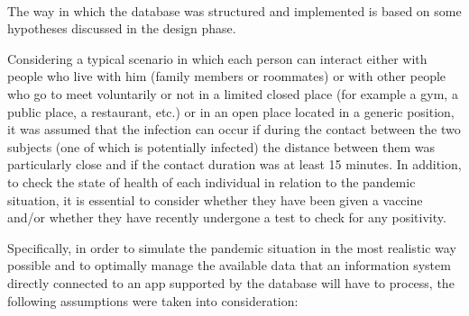 \documentclass[a4paper,12pt]{article}
\begin{document}
\paragraph{} The way in which the database was structured and implemented is based on some hypotheses discussed in the design phase. \par Considering a typical scenario in which each person can interact either with people who live with him (family members or roommates) or with other people who go to meet voluntarily or not in a limited closed place (for example a gym, a public place, a restaurant, etc.) or in an open place located in a generic position, it was assumed that the infection can occur if during the contact between the two subjects (one of which is potentially infected) the distance between them was particularly close and if the contact duration was at least 15 minutes. In addition, to check the state of health of each individual in relation to the pandemic situation, it is essential to consider whether they have been given a vaccine and/or whether they have recently undergone a test to check for any positivity. \par
Specifically, in order to simulate the pandemic situation in the most realistic way possible and to optimally manage the available data that an information system directly connected to an app supported by the database will have to process, the following assumptions were taken into consideration:
\end{document}
